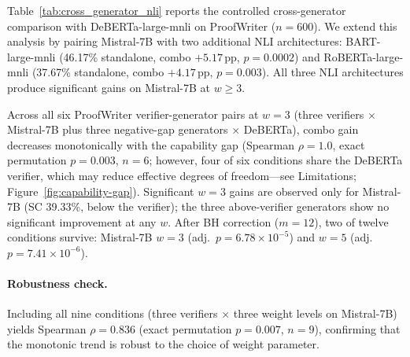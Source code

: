 Table~\ref{tab:cross_generator_nli} reports the controlled cross-generator comparison with DeBERTa-large-mnli on ProofWriter ($n{=}600$). We extend this analysis by pairing Mistral-7B with two additional NLI architectures: BART-large-mnli (46.17\% standalone, combo $+5.17$\,pp, $p = 0.0002$) and RoBERTa-large-mnli (37.67\% standalone, combo $+4.17$\,pp, $p = 0.003$). All three NLI architectures produce significant gains on Mistral-7B at $w \geq 3$.

Across all six ProofWriter verifier-generator pairs at $w{=}3$ (three verifiers $\times$ Mistral-7B plus three negative-gap generators $\times$ DeBERTa), combo gain decreases monotonically with the capability gap (Spearman $\rho = 1.0$, exact permutation $p = 0.003$, $n = 6$; however, four of six conditions share the DeBERTa verifier, which may reduce effective degrees of freedom---see Limitations; Figure~\ref{fig:capability-gap}). Significant $w{=}3$ gains are observed only for Mistral-7B (SC 39.33\%, below the verifier); the three above-verifier generators show no significant improvement at any $w$. After BH correction ($m{=}12$), two of twelve conditions survive: Mistral-7B $w{=}3$ (adj.\ $p = 6.78 \times 10^{-5}$) and $w{=}5$ (adj.\ $p = 7.41 \times 10^{-6}$).

\paragraph{Robustness check.} Including all nine conditions (three verifiers $\times$ three weight levels on Mistral-7B) yields Spearman $\rho = 0.836$ (exact permutation $p = 0.007$, $n = 9$), confirming that the monotonic trend is robust to the choice of weight parameter.

